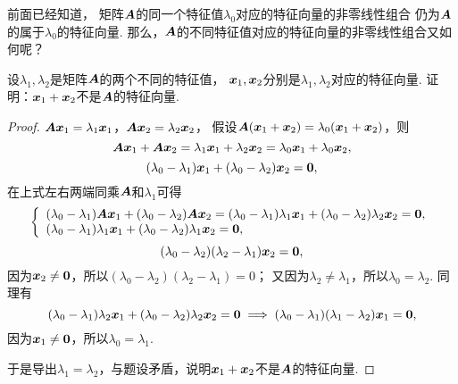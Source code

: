 前面已经知道，
矩阵\(\boldsymbol{A}\)的同一个特征值\(\lambda_0\)对应的特征向量的非零线性组合
仍为\(\boldsymbol{A}\)的属于\(\lambda_0\)的特征向量.
那么，\(\boldsymbol{A}\)的不同特征值对应的特征向量的非零线性组合又如何呢？
\begin{example}
设\(\lambda_1,\lambda_2\)是矩阵\(\boldsymbol{A}\)的两个不同的特征值，
\(\boldsymbol{x}_1,\boldsymbol{x}_2\)分别是\(\lambda_1,\lambda_2\)对应的特征向量.
证明：\(\boldsymbol{x}_1+\boldsymbol{x}_2\)不是\(\boldsymbol{A}\)的特征向量.
\begin{proof}
\(\boldsymbol{A}\boldsymbol{x}_1 = \lambda_1\boldsymbol{x}_1\)，\(\boldsymbol{A}\boldsymbol{x}_2 = \lambda_2\boldsymbol{x}_2\)，
假设\(\boldsymbol{A}(\boldsymbol{x}_1+\boldsymbol{x}_2) = \lambda_0(\boldsymbol{x}_1+\boldsymbol{x}_2)\)，则\begin{equation*}
	\boldsymbol{A}\boldsymbol{x}_1+\boldsymbol{A}\boldsymbol{x}_2 =\lambda_1\boldsymbol{x}_1+\lambda_2\boldsymbol{x}_2 = \lambda_0\boldsymbol{x}_1+\lambda_0\boldsymbol{x}_2,
\end{equation*}\begin{equation*}
	(\lambda_0-\lambda_1)\boldsymbol{x}_1+(\lambda_0-\lambda_2)\boldsymbol{x}_2 = \boldsymbol0,
\end{equation*}
在上式左右两端同乘\(\boldsymbol{A}\)和\(\lambda_1\)可得\begin{equation*}
	\left\{ \begin{array}{l}
		(\lambda_0-\lambda_1)\boldsymbol{A}\boldsymbol{x}_1+(\lambda_0-\lambda_2)\boldsymbol{A}\boldsymbol{x}_2 = (\lambda_0-\lambda_1)\lambda_1\boldsymbol{x}_1 + (\lambda_0-\lambda_2)\lambda_2\boldsymbol{x}_2 = \boldsymbol0, \\
		(\lambda_0-\lambda_1)\lambda_1\boldsymbol{x}_1+(\lambda_0-\lambda_2)\lambda_1\boldsymbol{x}_2 = \boldsymbol0,
	\end{array} \right.
\end{equation*}\begin{equation*}
	(\lambda_0-\lambda_2)(\lambda_2-\lambda_1)\boldsymbol{x}_2 = \boldsymbol0,
\end{equation*}
因为\(\boldsymbol{x}_2\neq\boldsymbol0\)，所以\((\lambda_0-\lambda_2)(\lambda_2-\lambda_1)=0\)；
又因为\(\lambda_2\neq\lambda_1\)，所以\(\lambda_0=\lambda_2\).
同理有\begin{equation*}
	(\lambda_0-\lambda_1)\lambda_2\boldsymbol{x}_1+(\lambda_0-\lambda_2)\lambda_2\boldsymbol{x}_2 = \boldsymbol0
	\implies
	(\lambda_0-\lambda_1)(\lambda_1-\lambda_2)\boldsymbol{x}_1 = \boldsymbol0,
\end{equation*}
因为\(\boldsymbol{x}_1\neq\boldsymbol0\)，所以\(\lambda_0=\lambda_1\).

于是导出\(\lambda_1=\lambda_2\)，与题设矛盾，说明\(\boldsymbol{x}_1+\boldsymbol{x}_2\)不是\(\boldsymbol{A}\)的特征向量.
\end{proof}
\end{example}


